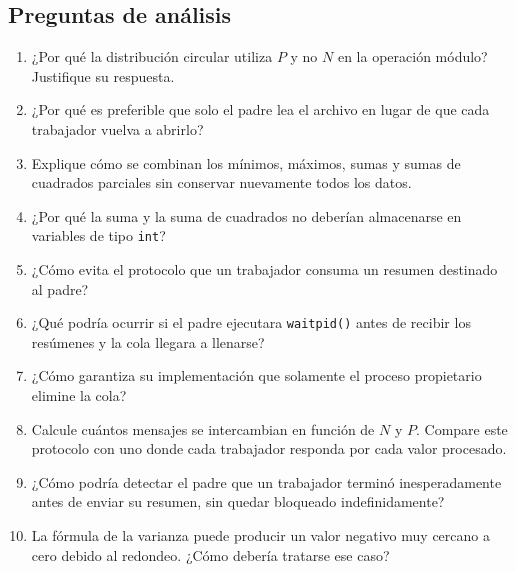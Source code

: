 \documentclass[12pt,a4paper]{article}
\begin{document}
\subsection*{Preguntas de análisis}
\thispagestyle{fancy}
\begin{enumerate}
    \item ¿Por qué la distribución circular utiliza $P$ y no $N$ en la operación módulo? Justifique su respuesta.
    \item ¿Por qué es preferible que solo el padre lea el archivo en lugar de que cada trabajador vuelva a abrirlo?
    \item Explique cómo se combinan los mínimos, máximos, sumas y sumas de cuadrados parciales sin conservar nuevamente todos los datos.
    \item ¿Por qué la suma y la suma de cuadrados no deberían almacenarse en variables de tipo \texttt{int}?
    \item ¿Cómo evita el protocolo que un trabajador consuma un resumen destinado al padre?
    \item ¿Qué podría ocurrir si el padre ejecutara \texttt{waitpid()} antes de recibir los resúmenes y la cola llegara a llenarse?
    \item ¿Cómo garantiza su implementación que solamente el proceso propietario elimine la cola?
    \item Calcule cuántos mensajes se intercambian en función de $N$ y $P$. Compare este protocolo con uno donde cada trabajador responda por cada valor procesado.
    \item ¿Cómo podría detectar el padre que un trabajador terminó inesperadamente antes de enviar su resumen, sin quedar bloqueado indefinidamente?
    \item La fórmula de la varianza puede producir un valor negativo muy cercano a cero debido al redondeo. ¿Cómo debería tratarse ese caso?
\end{enumerate}
\end{document}
